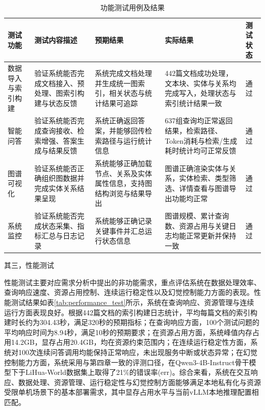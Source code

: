 \documentclass[promaster, vlined]{DissertUESTC}
\begin{document}
\begin{table}[!ht]
\caption{功能测试用例及结果}
\centering
\setlength{\tabcolsep}{3pt}
\begin{tabular}{@{}>{\raggedright\arraybackslash}p{1.5cm}>{\raggedright\arraybackslash}p{2.7cm}>{\raggedright\arraybackslash}p{2.9cm}>{\raggedright\arraybackslash}p{3.8cm}>{\centering\arraybackslash}p{1.1cm}@{}}
\toprule
测试功能 & 测试内容描述 & 预期结果 & 实际结果 & 测试状态 \\
\midrule
数据导入与索引构建 & 验证系统能否完成文档接入、预处理、图索引构建与状态反馈 & 系统完成文档处理并生成统一图索引，相关状态与统计结果可追踪 & 442篇文档成功处理，文本块、实体与关系均完成写入，处理状态与索引统计结果一致 & 通过 \\
智能问答 & 验证系统能否完成查询接收、检索增强、答案生成与结果反馈 & 系统正确返回答案，并能够回传检索路径与运行统计信息 & 637组查询均正常返回结果，检索路径、Token消耗与检索/生成耗时统计均可正常反馈 & 通过 \\
图谱可视化 & 验证系统能否正确组织图数据并完成实体关系结果呈现 & 系统能够正确加载节点、关系及实体属性信息，支持图结构浏览与结果导出 & 图谱正确渲染实体与关系，实体检索、类型筛选、详情查看与图谱导出功能均正常 & 通过 \\
系统监控 & 验证系统能否完成状态采集、指标汇总与日志记录 & 系统能够正确记录关键事件并汇总运行状态信息 & 图谱规模、累计查询数、资源占用与关键日志均能正常更新并保持一致 & 通过 \\
\bottomrule
\end{tabular}
\label{tab:core_function_test}
\end{table}

其三，性能测试

性能测试主要对应需求分析中提出的非功能需求，重点评估系统在数据处理效率、查询响应速度、资源占用控制、连续运行稳定性以及幻觉控制能力方面的表现。性能测试结果如表\ref{tab:performance_test}所示，系统在查询响应、资源管理与连续运行方面表现良好。根据442篇文档的索引构建日志统计，平均每篇文档的索引构建时长约为304.43秒，满足320秒的预期指标；在查询响应方面，100个测试问题的平均响应时间为8.94秒，满足10秒的预期要求；在资源占用方面，系统峰值内存占用14.2GB，显存占用20.4GB，均在资源约束范围内；在连续运行稳定性方面，系统对100次连续问答调用均能保持正常响应，未出现服务中断或状态异常；在幻觉控制能力方面，系统采用与第四章一致的评测口径，在Qwen3-4B-Instruct骨干模型下于LiHua-World数据集上取得了21\%的错误率(err)。综合来看，系统在交互响应、数据处理、资源管理、运行稳定性与幻觉控制方面能够满足本地私有化与资源受限单机场景下的基本部署需求，其中显存占用水平与当前vLLM本地推理配置相匹配。
\end{document}
